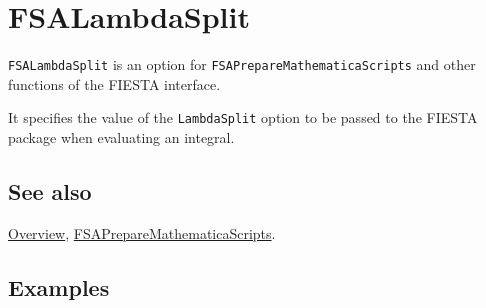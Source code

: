 \documentclass[../FeynHelpersManual.tex]{subfiles}
\begin{document}
\begin{Shaded}
\begin{Highlighting}[]
 
\end{Highlighting}
\end{Shaded}

\hypertarget{fsalambdasplit}{
\section{FSALambdaSplit}\label{fsalambdasplit}}

\texttt{FSALambdaSplit} is an option for
\texttt{FSAPrepareMathematicaScripts} and other functions of the FIESTA
interface.

It specifies the value of the \texttt{LambdaSplit} option to be passed
to the FIESTA package when evaluating an integral.

\subsection{See also}

\hyperlink{toc}{Overview},
\hyperlink{fsapreparemathematicascripts}{FSAPrepareMathematicaScripts}.

\subsection{Examples}
\end{document}
